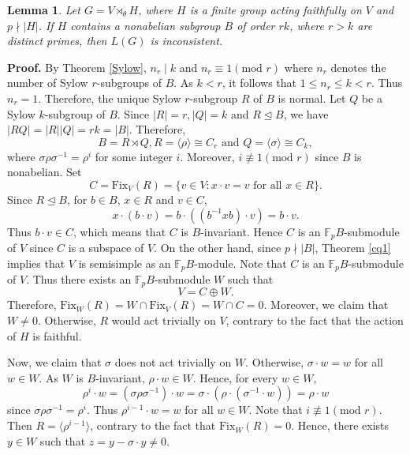 \documentclass[12pt]{article}
\newtheorem{lemma}{\bf Lemma}[section]
\def\proof{{\bf Proof.} }
\begin{document}
\begin{lemma}\label{LEMMA+1}
Let $G=V\rtimes_{\theta}H$, where $H$ is a finite group acting faithfully on $V$ and $p\nmid |H|$. If $H$ contains a nonabelian subgroup $B$ of order $rk$, where $r>k$ are distinct primes, then $L(G)$ is inconsistent.
\end{lemma}
\proof 
By Theorem \ref{Sylow}, $n_r\mid k$ and $n_r\equiv 1 (\mbox{mod } r)$ 
where $n_r$ denotes the number of Sylow $r$-subgroups of $B$. 
As $k<r$, it follows that $1\leq n_r\leq k<r$. Thus $n_r=1$.
Therefore, the unique Sylow $r$-subgroup $R$ of $B$ is normal.
Let $Q$ be a Sylow $k$-subgroup of $B$. Since $|R|=r, |Q|=k$ 
and $R\trianglelefteq B$, we have $|RQ|=|R||Q|=rk=|B|$. 
Therefore,
$$B=R\rtimes Q, R=\langle\rho\rangle\cong C_r \mbox{ and } Q=\langle\sigma\rangle\cong C_k,$$ 
where $\sigma\rho\sigma^{-1}=\rho^i$ for 
some integer $i$. Moreover, $i\not\equiv 1 (\mbox{mod } r)$ 
since $B$ is nonabelian. Set 
$$C=\mbox{Fix}_V(R)=\{v\in V: x\cdot v=v \mbox{ for all } x\in R\}.$$
Since $R\trianglelefteq B$, for $b\in B$, $x\in R$ and $v\in C$, 
$$x\cdot (b\cdot v)=b\cdot((b^{-1}xb)\cdot v)=b\cdot v.$$ 
Thus $b\cdot v\in C$, which means that $C$ is $B$-invariant. 
Hence $C$ is an $\mathbb{F}_pB$-submodule of $V$ since $C$ is a subspace of $V$. 
On the other hand, since $p\nmid |B|$, Theorem \ref{cq1} implies 
that $V$ is semisimple as an $\mathbb{F}_pB$-module. Note that $C$ 
is an $\mathbb{F}_pB$-submodule of $V$. Thus there exists an $\mathbb{F}_pB$-submodule $W$ such that 
$$V=C\oplus W.$$ Therefore, $\mbox{Fix}_W(R)=W\cap \mbox{Fix}_V(R)=W\cap C=0$.
Moreover, we claim that $W\neq 0$. Otherwise, $R$ 
would act trivially on $V$, contrary to the fact that 
the action of $H$ is faithful.

Now, we claim that $\sigma$ does not act trivially on $W$. 
Otherwise, $\sigma\cdot w=w$ for all $w\in W$. As $W$ is $B$-invariant, $\rho\cdot w\in W$. Hence, for every $w\in W$, 
$$\rho^i\cdot w
=(\sigma\rho\sigma^{-1})\cdot w
=\sigma\cdot(\rho\cdot(\sigma^{-1}\cdot w))
=\rho\cdot w$$ since $\sigma\rho\sigma^{-1}=\rho^i$. 
Thus $\rho^{i-1}\cdot w=w$ for all $w\in W$.
Note that $i\not\equiv 1 (\mbox{mod } r)$. 
Then $R=\langle\rho^{i-1}\rangle$, contrary to the 
fact that $\mbox{Fix}_W(R)=0$. 
Hence, there exists $y\in W$ such that $z=y-\sigma\cdot y\neq 0$. 
\end{document}

